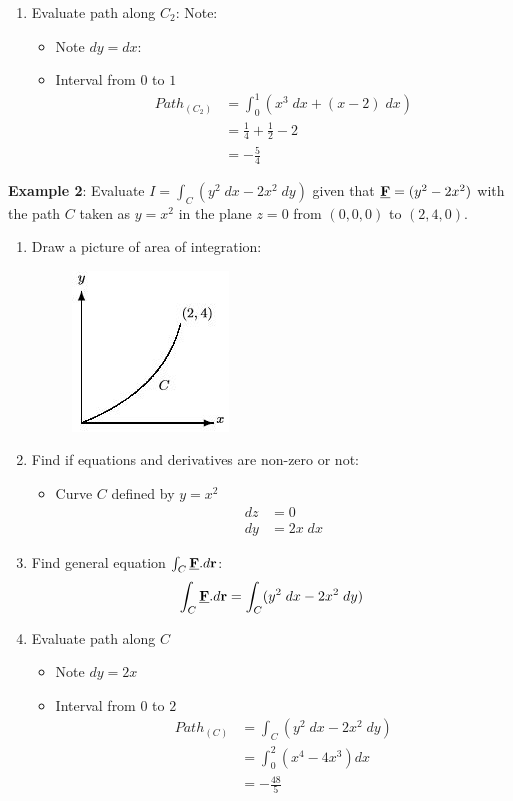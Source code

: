 \documentclass[10pt,a4paper]{article}
\begin{document}
\begin{enumerate}
    \item Evaluate path along $C_2$:
    Note:
    \begin{itemize}
        \item Note $dy=dx$:
        \item Interval from $0$ to $1$
        \begin{align*}
            Path_{(C_2)} &= \int_0^1 (x^3\;dx + (x-2)\;dx) \\
            &= \frac{1}{4}+\frac{1}{2}-2 \\
            &= -\frac{5}{4}
        \end{align*}
    \end{itemize}
\end{enumerate}

\textbf{Example 2}: Evaluate $I=\int_C (y^2\;dx-2x^2\;dy)$ given that
$\textbf{\underline{F}}=(y^2-2x^2)$ with the path $C$ taken as $y=x^2$ in the plane $z=0$ from
$(0,0,0)$ to $(2,4,0)$.
\begin{enumerate}
    \item Draw a picture of area of integration:
    \begin{figure} [h!]
        \centering
        \includegraphics[scale=0.8]{Example2.JPG}
    \end{figure}
    \item Find if equations and derivatives are non-zero or not: 
    \begin{itemize}
        \item Curve $C$ defined by $y=x^2$
        \begin{align*}
            dz&=0 \\
            dy&=2x\;dx
        \end{align*}
    \end{itemize}
    \item Find general equation $\int_{C}\textbf{\underline{F}}.d \textbf{r}$:
    \begin{align*}
        \int_{C}\textbf{\underline{F}}.d \textbf{r} = \int_C (y^2\;dx-2x^2\;dy)
    \end{align*}
    \item Evaluate path along $C$
    \begin{itemize}
        \item Note $dy=2x$
        \item Interval from $0$ to $2$
        \begin{align*}
            Path_{(C)} &= \int_C (y^2\;dx-2x^2\;dy) \\
            &= \int_0^2 (x^4 - 4x^3)dx \\
            &= -\frac{48}{5}
        \end{align*}
    \end{itemize}
\end{enumerate}
\end{document}
